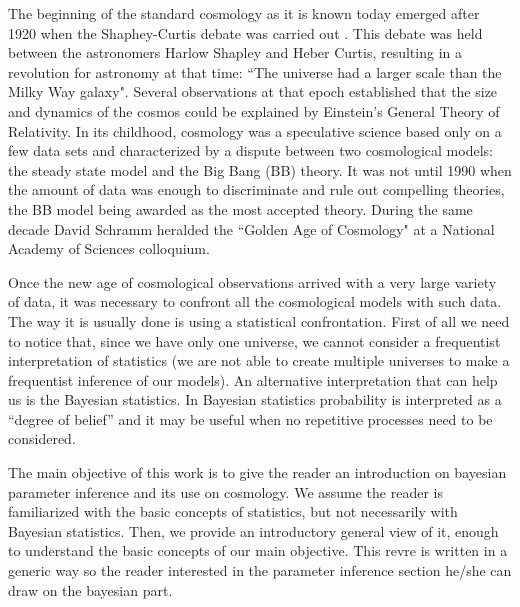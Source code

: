 \documentclass[onecolumn,           %
               showpacs,            %
               preprintnumbers,     %
               aps,                 %
               prl,          	    %
               letterpaper,             %
               superscriptaddress,      %
               nofootinbib,         %
               tightenlines,        %
               floats,floatfix      %
               ,usenatbib,
               ]{revtex4-1}
\begin{document}
The beginning of the standard cosmology as it is known today emerged after 1920 when the Shaphey-Curtis debate was carried out \cite{debate}. This debate was held between the astronomers Harlow Shapley and Heber Curtis, resulting in a revolution for astronomy at that time: ``The universe had a larger scale than the Milky Way galaxy". Several observations at that epoch established that the size and dynamics of the cosmos could be explained by Einstein's General Theory of Relativity. In its childhood, cosmology was a speculative science based only on a few data sets and characterized by a dispute between two cosmological models: the steady state model and the Big Bang (BB) theory. It was not until 1990 when the amount of data was enough to discriminate and rule out compelling theories, the BB model being awarded as the most accepted theory. During the same decade David Schramm heralded the ``Golden Age of Cosmology" at a National Academy of Sciences colloquium.    

Once the new age of cosmological observations arrived with a very large variety of data, it was necessary to confront all the cosmological models with such data. The way it is usually done is using a statistical confrontation. First of all we need to notice that, since we have only one universe, we cannot consider a frequentist interpretation of statistics (we are not able to create multiple universes to make a frequentist inference of our models). An alternative interpretation that can help us is the Bayesian statistics. In Bayesian statistics probability is interpreted as a ``degree of belief'' and it may be useful when no repetitive processes need to be considered.  

The main objective of this work is to give the reader an introduction on bayesian parameter inference and its use on cosmology. We assume the reader is familiarized with the basic concepts of statistics, but not necessarily with Bayesian statistics. Then, we provide an introductory general view of it, enough to understand the basic concepts of our main objective. This revre is written in a generic way so the reader interested in the parameter inference section he/she can draw on the bayesian part.  
\end{document}
